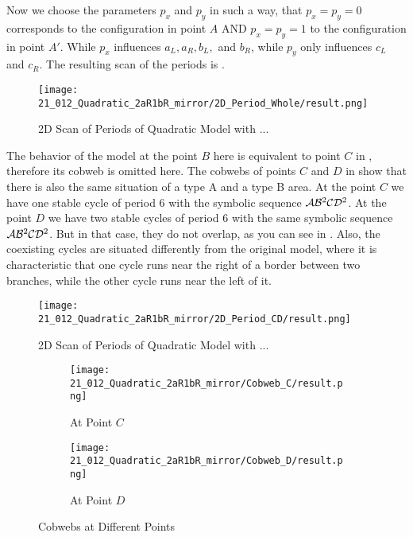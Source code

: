 Now we choose the parameters $p_x$ and $p_y$ in such a way, that $p_x = p_y = 0$ corresponds to the configuration in point $A$ AND $p_x = p_y = 1$ to the configuration in point $A'$.
While $p_x$ influences $a_L, a_R, b_L,$ and $b_R$, while $p_y$ only influences $c_L$ and $c_R$.
The resulting scan of the periods is .

\begin{figure}
    \centering
    \texttt{[image: 21\_012\_Quadratic\_2aR1bR\_mirror/2D\_Period\_Whole/result.png]}
    \caption{2D Scan of Periods of Quadratic Model with ...}
    \label{fig:quadratic.full.2aR1bR_mirr.1.2d.whole}
\end{figure}

The behavior of the model at the point $B$ here is equivalent to point $C$ in , therefore its cobweb is omitted here.
The cobwebs of points $C$ and $D$ in  show that there is also the same situation of a type A and a type B area.
At the point $C$ we have one stable cycle of period 6 with the symbolic sequence $\mathcal{A}\mathcal{B}^2\mathcal{C}\mathcal{D}^2$.
At the point $D$ we have two stable cycles of period 6 with the same symbolic sequence $\mathcal{A}\mathcal{B}^2\mathcal{C}\mathcal{D}^2$.
But in that case, they do not overlap, as you can see in .
Also, the coexisting cycles are situated differently from the original model, where it is characteristic that one cycle runs near the right of a border between two branches, while the other cycle runs near the left of it.

\begin{figure}
    \centering
    \texttt{[image: 21\_012\_Quadratic\_2aR1bR\_mirror/2D\_Period\_CD/result.png]}
    \caption{2D Scan of Periods of Quadratic Model with ...}
    \label{fig:quadratic.full.2aR1bR_mirr.1.2d.CD}
\end{figure}

\begin{figure}
    \centering
    \begin{subfigure}{0.4\textwidth}
        \centering
        \texttt{[image: 21\_012\_Quadratic\_2aR1bR\_mirror/Cobweb\_C/result.png]}
        \caption{At Point $C$}
        \label{fig:quad.full.2aR1bR_cL_mirr.1.CobwebC}
    \end{subfigure}
    \begin{subfigure}{0.4\textwidth}
        \centering
        \texttt{[image: 21\_012\_Quadratic\_2aR1bR\_mirror/Cobweb\_D/result.png]}
        \caption{At Point $D$}
        \label{fig:quad.full.2aR1bR_cL_mirr.1.CobwebD}
    \end{subfigure}
    \caption{Cobwebs at Different Points}
    \label{fig:quad.full.2aR1bR_cL_mirr.1.CobwebsCD}
\end{figure}

